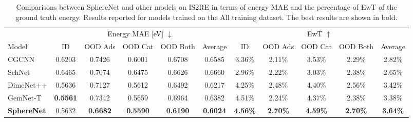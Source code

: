 \documentclass{article}
\begin{document}
\begin{table*}[t]
    \begin{center}
        \caption{Comparisons between SphereNet and other models on IS2RE in terms of energy MAE and the percentage of EwT of the ground truth energy. Results reported for models trained on the All training dataset. The best results are shown in bold.}
    \label{tb:oc20}
    \resizebox{\textwidth}{!}
            {\begin{tabular}{l ccccc | ccccc  }
            \bottomrule
            &\multicolumn{5}{c|}{Energy MAE [eV] $\downarrow$} & \multicolumn{5}{c}{EwT $\uparrow$}  \\
            \cmidrule(l{4pt}r{4pt}){2-6}
            \cmidrule(l{4pt}r{4pt}){7-11}
         Model & ID &  OOD Ads & OOD Cat & OOD Both &Average& ID &  OOD Ads & OOD Cat & OOD Both &Average\\
                \midrule
               CGCNN
                    & 0.6203 & 0.7426 & 0.6001& 0.6708& 0.6585
                    & 3.36\% & 2.11\% & 3.53\% & 2.29\% & 2.82\% \\
                 SchNet
                    & 0.6465 & 0.7074& 0.6475 & 0.6626& 0.6660
                    & 2.96\% & 2.22\% &3.03\%& 2.38\% & 2.65\% \\
                 DimeNet++
                    & 0.5636 & 0.7127 & 0.5612& 0.6492& 0.6217
                    & 4.25\% & 2.48\%& 4.40\%& 2.56\% & 3.42\%\\
                GemNet-T
                    & \textbf{0.5561} & 0.7342 & 0.5659& 0.6964& 0.6382
                    & 4.51\% & 2.24\%& 4.37\%& 2.38\% & 3.38\%\\
                 \textbf{SphereNet}
                    & 0.5632 & \textbf{0.6682} & \textbf{0.5590} & \textbf{0.6190}& \textbf{0.6024}
                    & \textbf{4.56\%} & \textbf{2.70\%} & \textbf{4.59\%} & \textbf{2.70\%}& \textbf{3.64\%} \\
            \bottomrule
            \end{tabular}}
            \vspace{-10pt}
    \end{center}
\end{table*}
\setlength{\tabcolsep}{1.4pt}
\end{document}
